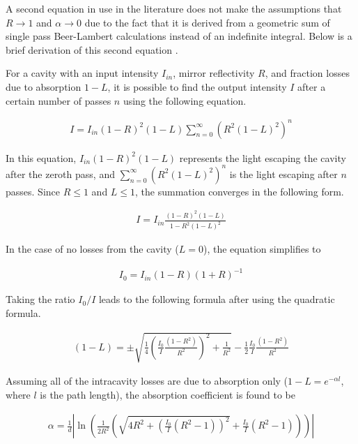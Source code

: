 A second equation in use in the literature does not make the assumptions
that $R \to 1$ and $\alpha \to 0$ due to the fact that it is derived from
a geometric sum of single pass Beer-Lambert calculations instead of an
indefinite integral. Below is a brief derivation of this
second equation \cite{Fiedler:2003db}.

For a cavity with an input intensity $I_{in}$, mirror reflectivity $R$,
and fraction losses due to absorption $1-L$, it is possible to find the
output intensity $I$ after a certain number of passes $n$ using the following
equation.

\begin{align*}
  I = I_{in}(1-R)^2(1-L)\sum_{n=0}^{\infty}(R^{2}(1-L)^{2})^{n}
\end{align*}

In this equation, $I_{in}(1-R)^2(1-L)$ represents the light escaping the
cavity after the zeroth pass, and $\sum_{n=0}^{\infty}(R^{2}(1-L)^{2})^{n}$ is
the light escaping after $n$ passes. Since $R \leq 1$ and $L \leq 1$, the
summation converges in the following form.

\begin{align*}
  I = I_{in}\frac{(1-R)^2(1-L)}{1-R^2(1-L)^2}
\end{align*}

In the case of no losses from the cavity ($L=0$), the equation simplifies to

\begin{align*}
  I_0 = I_{in}(1-R)(1+R)^{-1}
\end{align*}

Taking the ratio $I_0/I$ leads to the following formula after using the quadratic formula.

\begin{align*}
  (1-L) = \pm\sqrt{\frac{1}{4}\left(\frac{I_0}{I}\frac{(1-R^2)}{R^2}\right)^2+\frac{1}{R^2}} - \frac{1}{2}\frac{I_0}{I}\frac{(1-R^2)}{R^2}
\end{align*}


Assuming all of the intracavity losses are due to absorption only ($1-L =
e^{-\alpha l}$, where $l$ is the path length), the absorption coefficient is
found to be

  \begin{align}
    \alpha = \frac{1}{d}\left|\ln\left(\frac{1}{2R^2}\left(\sqrt{4R^2+\left(\frac{I_0}{I}(R^2-1)\right)^2} + \frac{I_0}{I}(R^2-1)\right)\right)\right| \label{eq:ceas_geo}
  \end{align}

